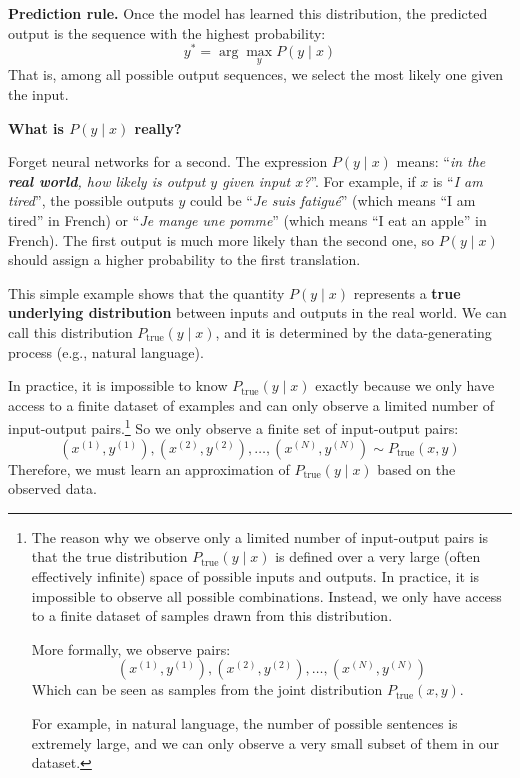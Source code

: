 \highspace
\textcolor{Green3}{ \textbf{Prediction rule.}} Once the model has learned this distribution, the predicted output is the sequence with the highest probability:
\begin{equation}
    y^{*} = \arg\max_{y} P\left(y \mid x\right)
\end{equation}
That is, among all possible output sequences, we select the most likely one given the input.

\newpage

\begin{flushleft}
    \textcolor{Green3}{ \textbf{What is $P\left(y \mid x\right)$ really?}}
\end{flushleft}
Forget neural networks for a second. The expression $P\left(y \mid x\right)$ means: ``\emph{in the \textbf{real world}, how likely is output $y$ given input $x$?}''. For example, if $x$ is ``\emph{I am tired}'', the possible outputs $y$ could be ``\emph{Je suis fatigué}'' (which means ``I am tired'' in French) or ``\emph{Je mange une pomme}'' (which means ``I eat an apple'' in French). The first output is much more likely than the second one, so $P\left(y \mid x\right)$ should assign a higher probability to the first translation.

\highspace
This simple example shows that the quantity $P\left(y \mid x\right)$ represents a \textbf{true underlying distribution} between inputs and outputs in the real world. We can call this distribution $P_{\text{true}}\left(y \mid x\right)$, and it is determined by the data-generating process (e.g., natural language).

\highspace
In practice, it is impossible to know $P_{\text{true}}\left(y \mid x\right)$ exactly because we only have access to a finite dataset of examples and can only observe a limited number of input-output pairs.\footnote{%
    The reason why we observe only a limited number of input-output pairs is that the true distribution $P_{\text{true}}\left(y \mid x\right)$ is defined over a very large (often effectively infinite) space of possible inputs and outputs. In practice, it is impossible to observe all possible combinations. Instead, we only have access to a finite dataset of samples drawn from this distribution.

    \highspace
    More formally, we observe pairs:
    \begin{equation*}
        \left(x^{(1)}, y^{(1)}\right), \left(x^{(2)}, y^{(2)}\right), \dots, \left(x^{(N)}, y^{(N)}\right)
    \end{equation*}
    Which can be seen as samples from the joint distribution $P_{\text{true}}(x, y)$.

    \highspace
    For example, in natural language, the number of possible sentences is extremely large, and we can only observe a very small subset of them in our dataset.%
} So we only observe a finite set of input-output pairs:
\begin{equation*}
    \left(x^{(1)}, y^{(1)}\right), \left(x^{(2)}, y^{(2)}\right), \dots, \left(x^{(N)}, y^{(N)}\right) \sim P_{\text{true}}\left(x, y\right)
\end{equation*}
Therefore, we must learn an approximation of $P_{\text{true}}\left(y \mid x\right)$ based on the observed data.

